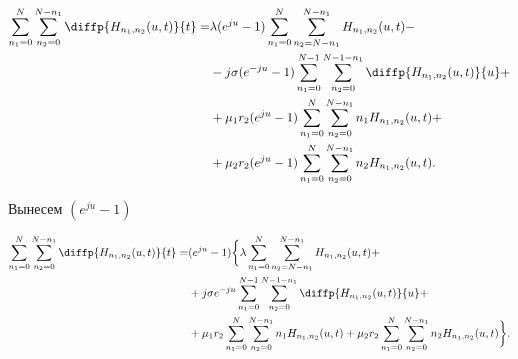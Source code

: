\begin{equation*}
	\begin{aligned}
		\sum_{n_1=0}^N\sum_{n_2=0}^{N-n_1} \diffp{H_{n_1,n_2}(u,t)}{t}=
		&\lambda (e^{ju} - 1)\sum_{n_1=0}^N\sum_{n_2=N-n_1}^{N-n_1} 
		H_{n_1, n_2}(u,t)-\\
		&- j \sigma(e^{-ju}-1)\sum_{n_1=0}^{N-1}\sum_{n_2=0}^{N-1-n_1} 
		\diffp{H_{n_1, n_2}(u,t)}{u}+\\
		&+\mu_1 r_2 (e^{ju} -1)\sum_{n_1=0}^{N}\sum_{n_2=0}^{N-n_1} 
		n_1 H_{n_1, n_2}(u,t)+\\
		&+\mu_2 r_2 (e^{ju} -1)\sum_{n_1=0}^{N}\sum_{n_2=0}^{N-n_1} 
		n_2 H_{n_1, n_2}(u,t).\\
	\end{aligned}
\end{equation*}

Вынесем $(e^{ju} - 1)$

\begin{equation*}
	\begin{aligned}
		\sum_{n_1=0}^N\sum_{n_2=0}^{N-n_1} \diffp{H_{n_1,n_2}(u,t)}{t}=
		&(e^{ju} - 1)\bigg\{\lambda \sum_{n_1=0}^N\sum_{n_2=N-n_1}^{N-n_1} 
		H_{n_1, n_2}(u,t)+\\
		&+ j \sigma e^{-ju}\sum_{n_1=0}^{N-1}\sum_{n_2=0}^{N-1-n_1} 
		\diffp{H_{n_1, n_2}(u,t)}{u}+\\
		&+\mu_1 r_2 \sum_{n_1=0}^{N}\sum_{n_2=0}^{N-n_1} 
		n_1 H_{n_1, n_2}(u,t)
		+\mu_2 r_2 \sum_{n_1=0}^{N}\sum_{n_2=0}^{N-n_1} 
		n_2 H_{n_1, n_2}(u,t)\bigg\}.\\
	\end{aligned}
\end{equation*}
